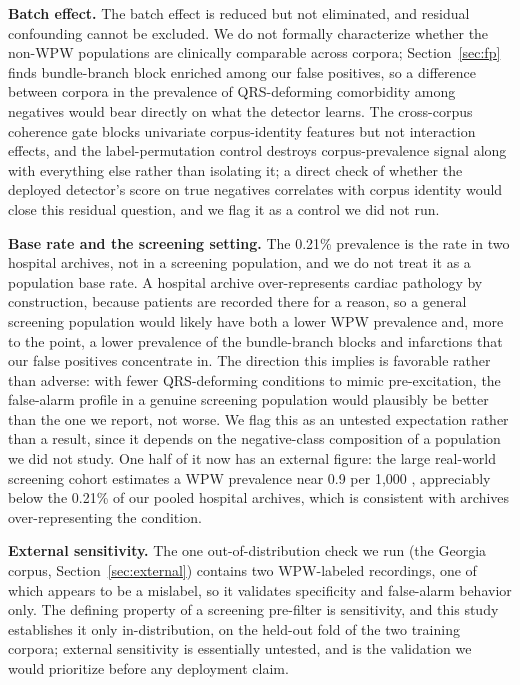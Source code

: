 \documentclass[11pt]{article}
\begin{document}
\textbf{Batch effect.} The batch effect is reduced but not eliminated, and residual confounding cannot be excluded. We do not formally characterize whether the non-WPW populations are clinically comparable across corpora; Section~\ref{sec:fp} finds bundle-branch block enriched among our false positives, so a difference between corpora in the prevalence of QRS-deforming comorbidity among negatives would bear directly on what the detector learns. The cross-corpus coherence gate blocks univariate corpus-identity features but not interaction effects, and the label-permutation control destroys corpus-prevalence signal along with everything else rather than isolating it; a direct check of whether the deployed detector's score on true negatives correlates with corpus identity would close this residual question, and we flag it as a control we did not run.

\textbf{Base rate and the screening setting.} The 0.21\% prevalence is the rate in two hospital archives, not in a screening population, and we do not treat it as a population base rate. A hospital archive over-represents cardiac pathology by construction, because patients are recorded there for a reason, so a general screening population would likely have both a lower WPW prevalence and, more to the point, a lower prevalence of the bundle-branch blocks and infarctions that our false positives concentrate in. The direction this implies is favorable rather than adverse: with fewer QRS-deforming conditions to mimic pre-excitation, the false-alarm profile in a genuine screening population would plausibly be better than the one we report, not worse. We flag this as an untested expectation rather than a result, since it depends on the negative-class composition of a population we did not study. One half of it now has an external figure: the large real-world screening cohort estimates a WPW prevalence near 0.9 per 1{,}000 \cite{huang}, appreciably below the 0.21\% of our pooled hospital archives, which is consistent with archives over-representing the condition.

\textbf{External sensitivity.} The one out-of-distribution check we run (the Georgia corpus, Section~\ref{sec:external}) contains two WPW-labeled recordings, one of which appears to be a mislabel, so it validates specificity and false-alarm behavior only. The defining property of a screening pre-filter is sensitivity, and this study establishes it only in-distribution, on the held-out fold of the two training corpora; external sensitivity is essentially untested, and is the validation we would prioritize before any deployment claim.
\end{document}
